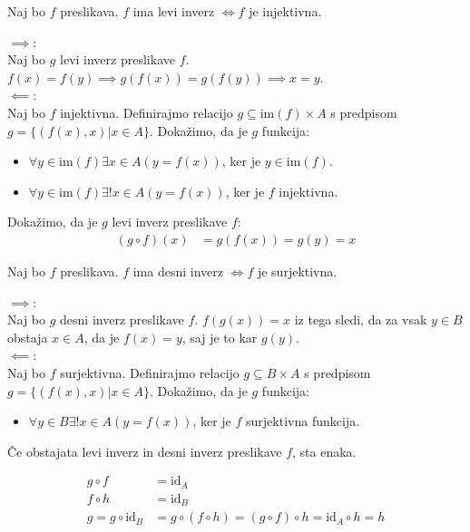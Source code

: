 \begin{trditev}
    Naj bo $f$ preslikava.
    $f$ ima levi inverz $\iff f$ je injektivna.
\end{trditev}
\begin{dokaz}
$\implies$: \\
Naj bo $g$ levi inverz preslikave $f$.
$f(x) = f(y) \implies g(f(x)) = g(f(y)) \implies x = y$. \\

$\impliedby$: \\
Naj bo $f$ injektivna.
Definirajmo relacijo $g \subseteq \text{im}(f) \times A$ s predpisom $g = \{(f(x), x) | x \in A\}$.
Dokažimo, da je $g$ funkcija:
\begin{itemize}
    \item $\forall y \in \text{im}(f) \exists x \in A(y = f(x))$, ker je $y \in \text{im}(f)$.
    \item $\forall y \in \text{im}(f) \exists! x \in A(y = f(x))$, ker je $f$ injektivna.
\end{itemize}
Dokažimo, da je $g$ levi inverz preslikave $f$:
\begin{align*}
    (g \circ f)(x) &= g(f(x)) = g(y) = x
\end{align*}
\end{dokaz}

\begin{trditev}
    Naj bo $f$ preslikava.
    $f$ ima desni inverz $\iff f$ je surjektivna.
\end{trditev}
\begin{dokaz}
$\implies$: \\
Naj bo $g$ desni inverz preslikave $f$.
$f(g(x)) = x$ iz tega sledi, da za vsak $y \in B$ obstaja $x \in A$, da je $f(x) = y$, saj je to kar $g(y)$. \\

$\impliedby$: \\
Naj bo $f$ surjektivna.
Definirajmo relacijo $g \subseteq B \times A$ s predpisom $g = \{(f(x), x) | x \in A\}$.
Dokažimo, da je $g$ funkcija:
\begin{itemize}
    \item $\forall y \in B \exists! x \in A(y = f(x))$, ker je $f$ surjektivna funkcija.
\end{itemize}
\end{dokaz}

\begin{trditev}
    Če obstajata levi inverz in desni inverz preslikave $f$, sta enaka.
\end{trditev}
\begin{dokaz}
\begin{align*}
    g \circ f &= \text{id}_A \\
    f \circ h &= \text{id}_B \\
    g = g \circ \text{id}_B &= g \circ (f \circ h) = (g \circ f) \circ h = \text{id}_A \circ h = h
\end{align*}
\end{dokaz}

